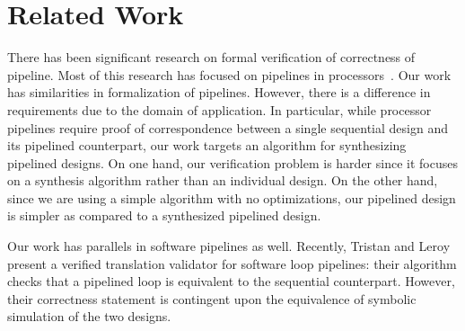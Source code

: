 \section{Related Work}
\label{sec:related}

There has been significant research on formal verification of correctness of pipeline. Most of this research has
focused on pipelines in processors~\cite{bd:pipeline,bt:pipeline,sh:pipeline,pm:pipelines,rh:pipelines,aagard-day:compare}.
Our work has similarities in formalization of pipelines. However, there is a difference in requirements due to the domain of application. In particular, while processor pipelines require proof of correspondence
between a single sequential design and its pipelined
counterpart, our work targets an algorithm for synthesizing pipelined designs. On one hand, our verification problem is harder since it
focuses on a synthesis algorithm rather than an individual
design.  On the other hand, since we are using a simple algorithm with no optimizations, our pipelined design is simpler as compared to a synthesized pipelined design.

Our work has parallels in software pipelines as well. Recently, Tristan and Leroy~\cite{tl:software-popl10}
present a verified translation validator for software loop
pipelines: their algorithm checks that a pipelined
loop is equivalent to the sequential counterpart. However,
their correctness statement is contingent upon the equivalence of symbolic simulation of the two designs.

